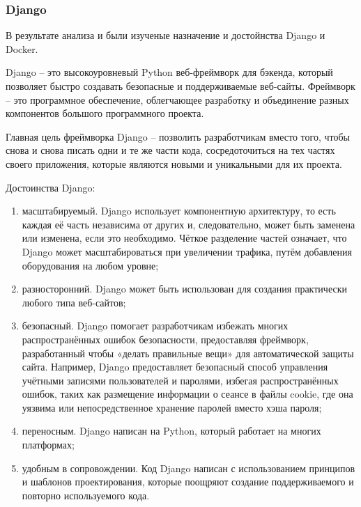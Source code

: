 \def\notedate{2022.10.24}
\def\currentauthor{Василян А.Р. (РК6-73Б)}

\subsubsection{Django}
В результате анализа \cite{Django-intro} и \cite{Docker-intro} были изученые назначение и достойнства Django и Docker.

Django -- это высокоуровневый Python веб-фреймворк для бэкенда, который позволяет быстро создавать безопасные и поддерживаемые веб-сайты. Фреймворк -- это программное обеспечение, облегчающее разработку и объединение разных компонентов большого программного проекта.
	
Главная цель фреймворка Django – позволить разработчикам вместо того, чтобы снова и снова писать одни и те же части кода, сосредоточиться на тех частях своего приложения, которые являются новыми и уникальными для их проекта.
	
Достоинства Django:
\begin{enumerate}
	\item масштабируемый.  Django использует компонентную архитектуру, то есть каждая её часть независима от других и, следовательно, может быть заменена или изменена, если это необходимо. Чёткое разделение частей означает, что Django может масштабироваться при увеличении трафика, путём добавления оборудования на любом уровне;
	\item разносторонний. Django может быть использован для создания практически любого типа веб-сайтов;
	\item безопасный. Django помогает разработчикам избежать многих распространённых ошибок безопасности, предоставляя фреймворк, разработанный чтобы «делать правильные вещи» для автоматической защиты сайта. Например, Django предоставляет безопасный способ управления учётными записями пользователей и паролями, избегая распространённых ошибок, таких как размещение информации о сеансе в файлы cookie, где она уязвима или непосредственное хранение паролей вместо хэша пароля;
	\item переносным. Django написан на Python, который работает на многих платформах;
	\item удобным в сопровождении. Код Django написан с использованием принципов и шаблонов проектирования, которые поощряют создание поддерживаемого и повторно используемого кода.
\end{enumerate}

